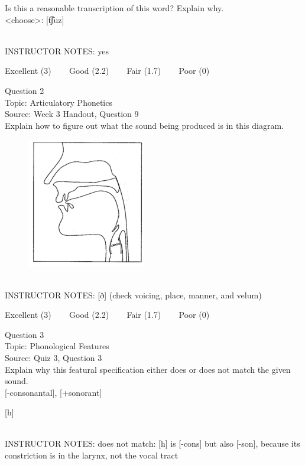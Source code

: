 \documentclass[12pt]{article}
\begin{document}
Is this a reasonable transcription of this word? Explain why.\\

<choose>: {[t͡ʃuz]}


~\\
INSTRUCTOR NOTES: yes


\vfill
Excellent (3) ~~~ Good (2.2) ~~~ Fair (1.7) ~~~ Poor (0)
\newpage

{\large Question 2}\\

Topic: Articulatory Phonetics\\
Source: Week 3 Handout, Question 9\\

Explain how to figure out what the sound being produced is in this diagram.\\

\begin{figure}[H]
\includegraphics{../images/sagittal_eth.png}
\end{figure}

~\\
INSTRUCTOR NOTES: [ð] (check voicing, place, manner, and velum)


\vfill
Excellent (3) ~~~ Good (2.2) ~~~ Fair (1.7) ~~~ Poor (0)
\newpage

{\large Question 3}\\

Topic: Phonological Features\\
Source: Quiz 3, Question 3\\

Explain why this featural specification either does or does not match the given sound.\\

{[-consonantal]}, {[+sonorant]}

{[h]}


~\\
INSTRUCTOR NOTES: does not match: [h] is [-cons] but also [-son], because its constriction is in the larynx, not the vocal tract
\end{document}
